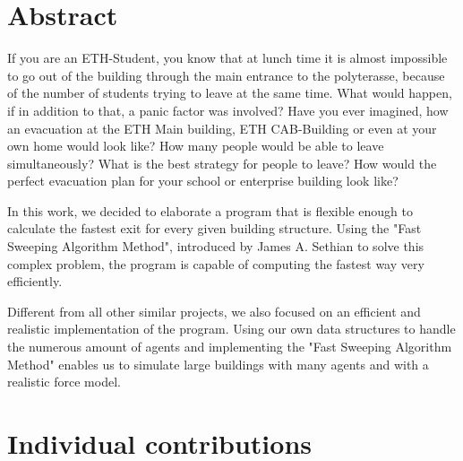 \documentclass[11pt]{article}
\begin{document}






\tableofcontents

\newpage




\section{Abstract}

If you are an ETH-Student, you know that at lunch time it is almost impossible to go out of the building through the main entrance to the polyterasse, because of the number of students trying to leave at the same time. What would happen, if in addition to that, a panic factor was involved? Have you ever imagined, how an evacuation at the ETH Main building, ETH CAB-Building or even at your own home would look like? How many people would be able to leave simultaneously? What is the best strategy for people to leave? How would the perfect evacuation plan for your school or enterprise building look like?

In this work, we decided to elaborate a program that is flexible enough to
calculate the fastest exit for every given building structure. Using the "Fast
Sweeping Algorithm Method", introduced by James A. Sethian\cite{Zhao04afast} to
solve this complex problem, the program is capable of computing the fastest way
very efficiently.

Different from all other similar projects, we also focused on an efficient and
realistic implementation of the program. Using our own data structures to
handle the numerous amount of agents and implementing the "Fast Sweeping
Algorithm Method" enables us to simulate large buildings with many agents and
with a realistic force model.


\section{Individual contributions}
\end{document}
